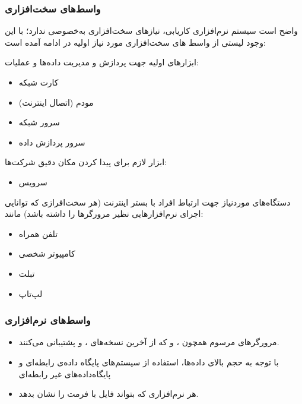 \documentclass[12pt,svgnames,oneside]{book}
\newcounter{itemadded}
\let\LaTeXStandardEnumerateBegin\enumerate
\let\LaTeXStandardEnumerateEnd\endenumerate
\renewenvironment{enumerate}{%
\LaTeXStandardEnumerateBegin%
\setcounter{itemadded}{0}
}{%
\LaTeXStandardEnumerateEnd%
}%
\begin{document}
\subsubsection{واسط‌های سخت‌افزاری}
واضح است سیستم نرم‌افزاری کاریابی، نیازهای سخت‌افزاری به‌خصوصی ندارد؛ با این وجود لیستی از واسط های سخت‌افزاری مورد نیاز اولیه در ادامه آمده است:
\begin{enumerate}
\item
ابزارهای اولیه جهت پردازش و مدیریت داده‌ها و عملیات:
\begin{itemize}
\item
کارت شبکه
\item
مودم (اتصال اینترنت)
\item
سرور شبکه
\item
سرور پردازش داده
\end{itemize}

\item
ابزار لازم برای پیدا کردن مکان دقیق شرکت‌ها:
\begin{itemize}
\item
سرویس 
\end{itemize}

\item
دستگاه‌های موردنیاز جهت ارتباط افراد با بستر اینترنت (هر سخت‌افرازی که توانایی اجرای نرم‌افزارهایی نظیر مرورگرها را داشته باشد) مانند:
\begin{itemize}
\item
تلفن همراه
\item
کامپیوتر شخصی
\item
تبلت
\item
لپ‌تاپ
\end{itemize}

\end{enumerate}
\subsubsection{واسط‌های نرم‌افزاری}\label{software}
\begin{itemize}
\item
مرورگر‌های مرسوم همچون
،
 و
						که از آخرین نسخه‌های
،
						و
						پشتیبانی می‌کنند.

\item
با توجه به حجم بالای داده‌ها، استفاده از سیستم‌های پایگاه‌ داده‌ی رابطه‌ای
و پایگاه‌داده‌های غیر رابطه‌ای
\item
هر نرم‌افزاری که بتواند فایل با فرمت  را نشان بدهد.
\end{itemize}
\end{document}

